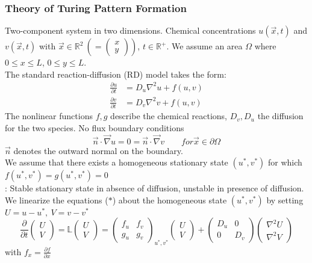 \subsubsection{Theory of Turing Pattern Formation}
Two-component system in two dimensions. Chemical concentrations $u(\vec{x},t)$ and $v(\vec{x},t)$ with $\vec{x}\in\mathbb{R}^2\ \left(=\begin{pmatrix} x\\ y\end{pmatrix}\right)$, $t\in\mathbb{R}^+$. We assume an area $\Omega$ where $0\leq x \leq L$, $0\leq y\leq L$.\\
The standard reaction-diffusion (RD) model takes the form:
\begin{align*}
	\frac{\partial u}{\partial t}&=D_u\nabla^2u +f(u,v)\\
	\frac{\partial v}{\partial t}&=D_v\nabla^2v+f(u,v)
\end{align*}
The nonlinear functions $f,g$ describe the chemical reactions, $D_v,D_u$ the diffusion for the two species. No flux boundary conditions
\begin{equation*}
	\vec{n}\cdot\vec{\nabla}u=0=\vec{n}\cdot\vec{\nabla} v\qquad for \vec{x}\in\partial\Omega
\end{equation*}
$\vec{n}$ denotes the outward normal on the boundary.\\
We assume that there exists a homogeneous stationary state $(u^*,v^\ast)$ for which $f(u^\ast,v^\ast)=g(u^\ast,v^\ast)=0$\vspace{1mm}\\
\textbf{\underline{}}: Stable stationary state in absence of diffusion, unstable in presence of diffusion. We linearize the equations ($*$) about the homogeneous state $(u^*,v^*)$ by setting $U=u-u^*,\ V=v-v^*$
\begin{equation*}
	\frac{\partial}{\partial t}\begin{pmatrix} U\\ V \end{pmatrix} = \mathbb{L}\begin{pmatrix}U\\ V\end{pmatrix}=\begin{pmatrix}f_u&f_v\\ g_u&g_v\end{pmatrix}_{u^*,v^*}\begin{pmatrix}U\\ V\end{pmatrix}+\begin{pmatrix}D_u&0\\ 0&D_v\end{pmatrix}\begin{pmatrix}\nabla^2 U\\\nabla^2 V\end{pmatrix}
\end{equation*}
with $f_x=\frac{\partial f}{\partial x}$
